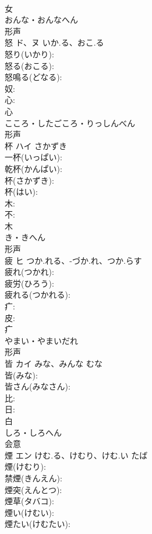 \documentclass[8pt]{extreport}
\begin{document}
\begin{CJK}{UTF8}{min}
\\	女	
\\	おんな・おんなへん	
\\	形声 
\\	怒	ド、ヌ	いか.る、おこ.る		
\\	怒り(いかり): 
\\	怒る(おこる): 
\\	怒鳴る(どなる): 
\\	奴: 
\\	心: 
\\	心	
\\	こころ・したごころ・りっしんべん	
\\	形声 
\\	杯	ハイ	さかずき		
\\	一杯(いっぱい): 
\\	乾杯(かんぱい): 
\\	杯(さかずき): 
\\	杯(はい): 
\\	木: 
\\	不: 
\\	木	
\\	き・きへん	
\\	形声 
\\	疲	ヒ	つか.れる、-づか.れ、つか.らす		
\\	疲れ(つかれ): 
\\	疲労(ひろう): 
\\	疲れる(つかれる): 
\\	疒: 
\\	皮: 
\\	疒	
\\	やまい・やまいだれ	
\\	形声 
\\	皆	カイ	みな、みんな	むな	
\\	皆(みな): 
\\	皆さん(みなさん): 
\\	比: 
\\	日: 
\\	白	
\\	しろ・しろへん	
\\	会意 
\\	煙	エン	けむ.る、けむり、けむ.い	たば	
\\	煙(けむり): 
\\	禁煙(きんえん): 
\\	煙突(えんとつ): 
\\	煙草(タバコ): 
\\	煙い(けむい): 
\\	煙たい(けむたい): 

\end{CJK}
\end{document}
